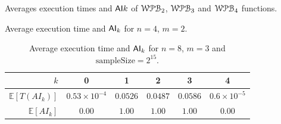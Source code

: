 \documentclass[11pt]{llncs}
\begin{document}
\begin{table}
    \centering
    \caption{Averages execution times and $\mathsf{AI}{k}$ of $\mathcal{WPB}_{2}$, $\mathcal{WPB}_{3}$ and $\mathcal{WPB}_{4}$ functions.}
    \label{table:transposed_averages}

    \begin{subtable}[t]{0.8\textwidth}
        \centering
        \caption{Average execution time and $\mathsf{AI}_{k}$ for $n=4$, $m=2$.}
        \label{table:averagesFullDist}
        \renewcommand{\arraystretch}{1.2}
        \renewcommand{\tabcolsep}{3pt}	
        \begin{tabular}{r|ccccc}
            \toprule
            $k$ & 0 & 1 & 2 & 3 & 4 \\
            \midrule
            $\mathbb{E}[T(AI_k)]$ & $0.53\times 10^{-4}$ & $0.0526$ & $0.0487$ & $0.0586$ & $0.6\times10^{-5}$\\
            $\mathbb{E}[AI_k]$     & $0.00$     & $1.00$     & $1.00$     & $1.00$     & $0.00$ \\
            \bottomrule
        \end{tabular}
    \end{subtable}

    \vspace{1em} %

    \begin{subtable}[t]{0.9\textwidth}
        \centering
        \caption{Average execution time and $\mathsf{AI}_{k}$ for $n=8$, $m=3$ and $\mbox{sampleSize}=2^{15}$.}
        \label{table:averages32768}
        \renewcommand{\arraystretch}{1.2}
    \end{subtable}

    \vspace{1em} %


\end{table}
\end{document}
